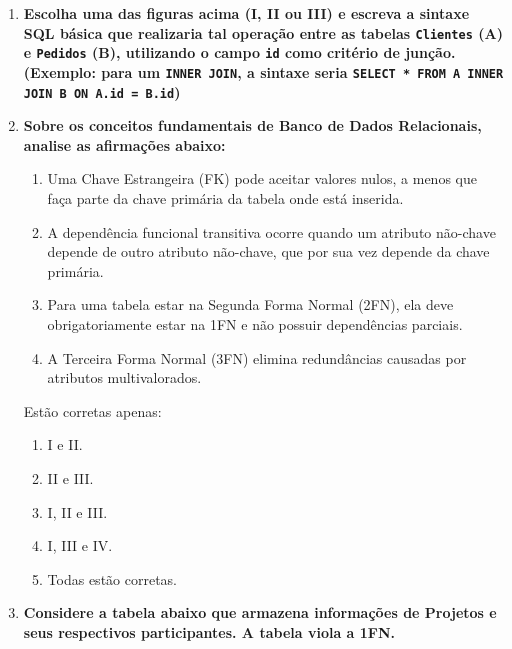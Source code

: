 \documentclass[12pt,a4paper]{article}
\newcommand{\resposta}[1]{
\noindent
\framebox[\textwidth]{
\begin{minipage}{0.98\textwidth}
\vspace{#1}
\end{minipage}
}
}
\begin{document}
\begin{enumerate}
    \item \textbf{Escolha uma das figuras acima (I, II ou III) e escreva a sintaxe SQL básica que realizaria tal operação entre as tabelas \texttt{Clientes} (A) e \texttt{Pedidos} (B), utilizando o campo \texttt{id} como critério de junção. (Exemplo: para um \texttt{INNER JOIN}, a sintaxe seria \texttt{SELECT * FROM A INNER JOIN B ON A.id = B.id})}\\
    \resposta{2.5cm}
    \item \textbf{Sobre os conceitos fundamentais de Banco de Dados Relacionais, analise as afirmações abaixo:}
    \begin{enumerate}[label=\Roman*.]
        \item Uma Chave Estrangeira (FK) pode aceitar valores nulos, a menos que faça parte da chave primária da tabela onde está inserida.
        \item A dependência funcional transitiva ocorre quando um atributo não-chave depende de outro atributo não-chave, que por sua vez depende da chave primária.
        \item Para uma tabela estar na Segunda Forma Normal (2FN), ela deve obrigatoriamente estar na 1FN e não possuir dependências parciais.
        \item A Terceira Forma Normal (3FN) elimina redundâncias causadas por atributos multivalorados.
    \end{enumerate}
    Estão corretas apenas:
    \begin{enumerate}[label=\Alph*)]
        \item I e II.
        \item II e III.
        \item I, II e III.
        \item I, III e IV.
        \item Todas estão corretas.
    \end{enumerate}

    \item \textbf{Considere a tabela abaixo que armazena informações de Projetos e seus respectivos participantes. A tabela viola a 1FN.}
    

\end{enumerate}
\end{document}
